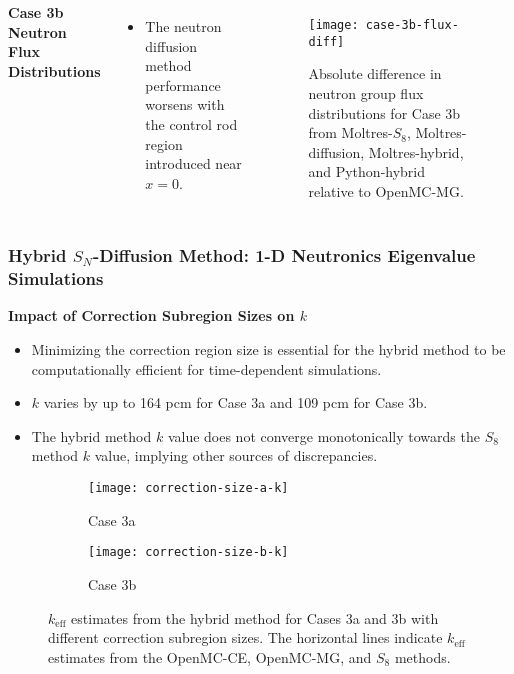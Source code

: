 \begin{frame}
  \begin{columns}
    \column{5.5cm}
    \textbf{Case 3b Neutron Flux Distributions}
    \begin{itemize}
      \item The neutron diffusion method performance worsens with the control rod region introduced
        near $x=0$.
    \end{itemize}
    \column{5.5cm}
    \begin{figure}[htb!]
      \centering
      \texttt{[image: case-3b-flux-diff]}
      \caption{Absolute difference in neutron group flux distributions for Case 3b from Moltres-$S_8$,
      Moltres-diffusion, Moltres-hybrid, and Python-hybrid relative to OpenMC-MG.}
      \label{fig:3b-flux-diff}
    \end{figure}
  \end{columns}
\end{frame}

\begin{frame}
  \frametitle{Hybrid $S_N$-Diffusion Method: 1-D Neutronics Eigenvalue Simulations}
  \textbf{Impact of Correction Subregion Sizes on $k$}
  \begin{itemize}
    \item Minimizing the correction region size is essential for the hybrid method to be
      computationally efficient for time-dependent simulations.
    \item $k$ varies by up to 164 pcm for Case 3a and 109 pcm for Case 3b.
    \item The hybrid method $k$ value does not converge monotonically towards the $S_8$ method $k$ value,
      implying other sources of discrepancies.
  \end{itemize}
  \begin{figure}[h]
    \centering
    \begin{subfigure}[b]{0.49\columnwidth}
      \centering
      \texttt{[image: correction-size-a-k]}
      \caption{Case 3a}
      \label{fig:v1-size-a-k}
    \end{subfigure}
    \hfill
    \begin{subfigure}[b]{0.49\columnwidth}
      \centering
      \texttt{[image: correction-size-b-k]}
      \caption{Case 3b}
      \label{fig:v1-size-b-k}
    \end{subfigure}
    \caption{$k_\text{eff}$ estimates from the hybrid method for Cases 3a and 3b with different
    correction subregion sizes. The horizontal lines indicate $k_\text{eff}$ estimates from the
    OpenMC-CE, OpenMC-MG, and $S_8$ methods.}
    \label{fig:v1-size-k}
  \end{figure}
\end{frame}

